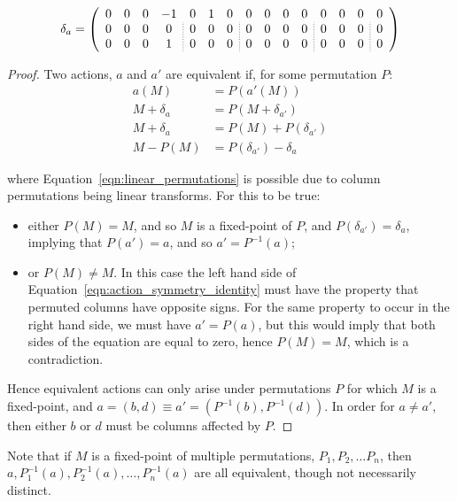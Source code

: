 \documentclass{article}
\begin{document}
\begin{equation}
\delta_a  =\left(\begin{array}{cccc ;{0.6pt/1.4pt} ccc ;{0.6pt/1.4pt} cccc ;{0.6pt/1.4pt} ccc ;{0.6pt/1.4pt} c}
0 & 0 & 0 & -1 & 0 & 1 & 0 & 0 & 0 & 0 & 0 & 0 & 0 & 0 & 0 \\
0 & 0 & 0 & 0 & 0 & 0 & 0 & 0 & 0 & 0 & 0 & 0 & 0 & 0 & 0 \\
0 & 0 & 0 & 1 & 0 & 0 & 0 & 0 & 0 & 0 & 0 & 0 & 0 & 0 & 0
\end{array}\right)
\end{equation}

\begin{proof}
Two actions, $a$ and $a'$ are equivalent if, for some permutation $P$:
\begin{align}
a(M) &= P(a'(M)) \\
M + \delta_a &= P(M + \delta_{a'}) \\
M + \delta_a &= P(M) + P(\delta_{a'}) \label{eqn:linear_permutations}\\
M - P(M) &= P(\delta_{a'}) - \delta_a \label{eqn:action_symmetry_identity}
\end{align}

where Equation~\ref{eqn:linear_permutations} is possible due to column
permutations being linear transforms.
For this to be true:
\begin{itemize}
  \item either $P(M) = M$, and so $M$ is a fixed-point of $P$, and
  $P(\delta_{a'}) = \delta_a$, implying that $P(a') = a$, and so
  $a' = P^{-1}(a)$;
  \item or $P(M) \neq M$. In this case the left hand side of
  Equation~\ref{eqn:action_symmetry_identity} must have the property that
  permuted columns have opposite signs.
  For the same property to occur in the right hand side, we must have
  $a' = P(a)$, but this would imply that both sides of the equation are equal
  to zero, hence $P(M) = M$, which is a contradiction.
\end{itemize}

Hence equivalent actions can only arise under permutations $P$ for which $M$ 
is a fixed-point, and $a = (b, d) \equiv a' = (P^{-1}(b), P^{-1}(d))$.
In order for $a \neq a'$, then either $b$ or $d$ must be columns affected
by $P$.
\end{proof}

Note that if $M$ is a fixed-point of multiple permutations,
$P_1, P_2, \dots P_n$, then $a, P^{-1}_1(a), P^{-1}_2(a), \dots, P^{-1}_n(a)$ are
all equivalent, though not necessarily distinct.
\end{document}
